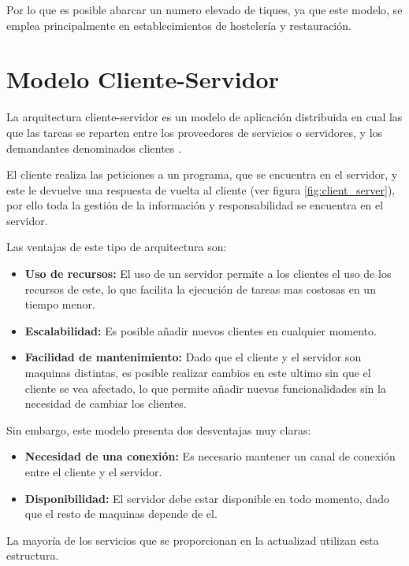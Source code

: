Por lo que es posible abarcar un numero elevado de tiques, ya que este modelo, se emplea principalmente en establecimientos de hostelería y restauración.


\section{Modelo Cliente-Servidor}

La arquitectura cliente-servidor es un modelo de aplicación distribuida en cual las que las tareas se reparten entre los proveedores de servicios o servidores, y los demandantes denominados clientes \cite{wiki:Cliente-servidor}.

El cliente realiza las peticiones a un programa, que se encuentra en el servidor, y este le devuelve una respuesta de vuelta al cliente (ver figura \ref{fig:client_server}), por ello toda la gestión de la información y responsabilidad se encuentra en el servidor.


Las ventajas de este tipo de arquitectura son: 
\begin{itemize}
	\item \textbf{Uso de recursos:} El uso de un servidor permite a los clientes el uso de los recursos de este, lo que facilita la ejecución de tareas mas costosas en un tiempo menor.
	\item \textbf{Escalabilidad:} Es posible añadir nuevos clientes en cualquier momento.
	\item \textbf{Facilidad de mantenimiento:} Dado que el cliente y el servidor son maquinas distintas, es posible realizar cambios en este ultimo sin que el cliente se vea afectado, lo que permite añadir nuevas funcionalidades sin la necesidad de cambiar los clientes.
\end{itemize}

Sin embargo, este modelo presenta dos desventajas muy claras:
\begin{itemize}
	\item \textbf{Necesidad de una conexión:} Es necesario mantener un canal de conexión entre el cliente y el servidor.
	\item \textbf{Disponibilidad:} El servidor debe estar disponible en todo momento, dado que el resto de maquinas depende de el.
\end{itemize}

La mayoría de los servicios que se proporcionan en la actualizad utilizan esta estructura.


